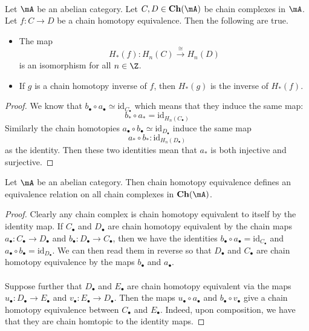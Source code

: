 \documentclass[a4paper]{article}
\begin{document}
\begin{lmm}{}{}\\
Let $\mA$ be an abelian category. Let $C,D\in\bold{Ch}(\mA)$ be chain complexes in $\mA$. Let $f:C\to D$ be a chain homotopy equivalence. Then the following are true. 
\begin{itemize}
\item The map $$H_\ast(f):H_n(C)\overset{\cong}{\longrightarrow}H_n(D)$$ is an isomorphism for all $n\in\Z$. 
\item If $g$ is a chain homotopy inverse of $f$, then $H_\ast(g)$ is the inverse of $H_\ast(f)$. 
\end{itemize}
\begin{proof}
We know that $b_\bullet\circ a_\bullet\simeq\text{id}_{C_\bullet}$ which means that they induce the same map: $$b_\ast\circ a_\ast=\text{id}_{H_n(C_\bullet)}$$ Similarly the chain homotopies $a_\bullet\circ b_\bullet\simeq\text{id}_{D_\bullet}$ induce the same map $$a_\ast\circ b_\ast:\text{id}_{H_n(D_\bullet)}$$ as the identity. Then these two identities mean that $a_\ast$ is both injective and surjective. 
\end{proof}
\end{lmm}

\begin{prp}{}{} Let $\mA$ be an abelian category. Then chain homotopy equivalence defines an equivalence relation on all chain complexes in $\bold{Ch}(\mA)$. 
\begin{proof}
Clearly any chain complex is chain homotopy equivalent to itself by the identity map. If $C_\bullet$ and $D_\bullet$ are chain homotopy equivalent by the chain maps $a_\bullet:C_\bullet\to D_\bullet$ and $b_\bullet:D_\bullet\to C_\bullet$, then we have the identities $b_\bullet\circ a_\bullet=\text{id}_{C_\bullet}$ and $a_\bullet\circ b_\bullet=\text{id}_{D_\bullet}$. We can then read them in reverse so that $D_\bullet$ and $C_\bullet$ are chain homotopy equivalence by the maps $b_\bullet$ and $a_\bullet$. \\~\\

Suppose further that $D_\bullet$ and $E_\bullet$ are chain homotopy equivalent via the maps $u_\bullet:D_\bullet\to E_\bullet$ and $v_\bullet:E_\bullet\to D_\bullet$. Then the maps $u_\bullet\circ a_\bullet$ and $b_\bullet\circ v_\bullet$ give a chain homotopy equivalence between $C_\bullet$ and $E_\bullet$. Indeed, upon composition, we have that they are chain  homtopic to the identity maps. 
\end{proof}
\end{prp}
\end{document}
